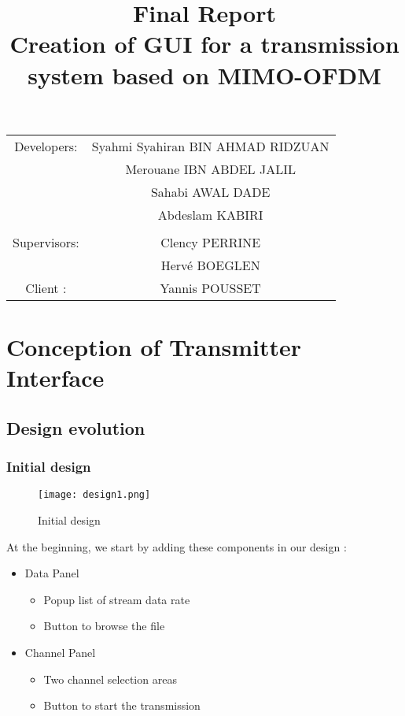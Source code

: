 \documentclass[12pt,a4paper]{article}
\begin{document}
\title{\textbf {\huge Final Report\\ Creation of GUI for a transmission system based on MIMO-OFDM}}
\maketitle

\begin{center}
\begin{tabular}{c c}
 
Developers: & Syahmi Syahiran BIN AHMAD RIDZUAN \\
& Merouane IBN ABDEL JALIL \\
& Sahabi AWAL DADE \\ 
& Abdeslam KABIRI\\ %
\\
Supervisors: &  Clency PERRINE \\ 
& Herv\'e BOEGLEN \\ %
Client : & Yannis POUSSET \\	
\end{tabular}
\end{center}

\clearpage

\section{Conception of Transmitter Interface}

\subsection{Design evolution}

\subsubsection{Initial design}
\begin{figure}[h!]
  \centering
    \texttt{[image: design1.png]}
  \caption{Initial design}
  \label{fig:design1 }
\end{figure}
\par At the beginning, we start by adding these components in our design :
\begin{itemize}
	\item Data Panel
	\begin{itemize}
		\item Popup list of stream data rate 
		\item Button to browse the file
	\end{itemize}
	\item Channel Panel
	\begin{itemize}
		\item Two channel selection areas 
		\item Button to start the transmission
	\end{itemize}
\end{itemize}
\end{document}
